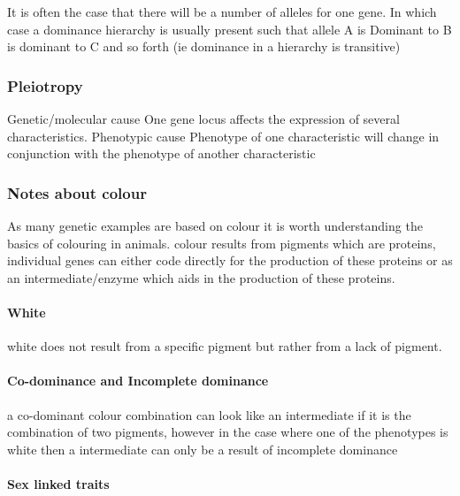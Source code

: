 \documentclass[]{article}
\let\oldparagraph\paragraph
\renewcommand{\paragraph}[1]{\oldparagraph{#1}\mbox{}}
\begin{document}
It is often the case that there will be a number of alleles for one
gene. In which case a dominance hierarchy is usually present such that
allele A is Dominant to B is dominant to C and so forth (ie dominance in
a hierarchy is transitive)

\hypertarget{pleiotropy}{%
\subsubsection{Pleiotropy}\label{pleiotropy}}

Genetic/molecular cause One gene locus affects the expression of several
characteristics. Phenotypic cause Phenotype of one characteristic will
change in conjunction with the phenotype of another characteristic

\hypertarget{notes-about-colour}{%
\subsubsection{Notes about colour}\label{notes-about-colour}}

As many genetic examples are based on colour it is worth understanding
the basics of colouring in animals. colour results from pigments which
are proteins, individual genes can either code directly for the
production of these proteins or as an intermediate/enzyme which aids in
the production of these proteins.

\hypertarget{white}{%
\paragraph{White}\label{white}}

white does not result from a specific pigment but rather from a lack of
pigment.

\hypertarget{co-dominance-and-incomplete-dominance}{%
\paragraph{Co-dominance and Incomplete
dominance}\label{co-dominance-and-incomplete-dominance}}

a co-dominant colour combination can look like an intermediate if it is
the combination of two pigments, however in the case where one of the
phenotypes is white then a intermediate can only be a result of
incomplete dominance

\hypertarget{sex-linked-traits}{%
\paragraph{Sex linked traits}\label{sex-linked-traits}}
\end{document}
